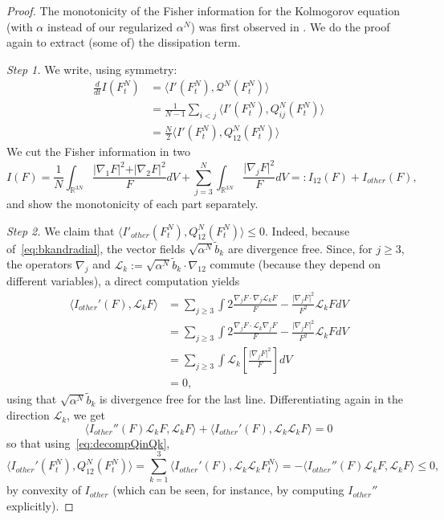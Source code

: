 \documentclass[11pt,a4paper]{article}
\theoremstyle{definition}
\theoremstyle{plain}
\begin{document}
\begin{proof}
    The monotonicity of the Fisher information for the Kolmogorov equation (with $\alpha$ instead of our regularized $\alpha^N$) was first observed in \cite{CarrilloGuo2025}. We do the proof again to extract (some of) the dissipation term.
    
    \textit{Step 1.} We write, using symmetry:
    \begin{align}
    \label{eq:prooffisher}
        \frac{d}{dt} I(F^N_t) &= \langle I'(F^N_t) , \mathcal{Q}^N (F^N_t)\rangle\nonumber\\
        &=\frac{1}{N-1}\sum_{i<j}\langle I'(F^N_t) , Q^N_{ij} (F^N_t)\rangle\nonumber\\
        &=\frac{N}{2}\langle I'(F^N_t) , Q^N_{12} (F^N_t)\rangle
    \end{align}
    We cut the Fisher information in two
    $$I(F)  = \frac{1}{N}\int_{\mathbb{R}^{3N}} \frac{\vert \nabla_1 F \vert^2+\vert \nabla_2 F \vert^2}{F} dV + \sum_{j=3}^N\int_{\mathbb{R}^{3N}} \frac{\vert \nabla_j F \vert^2}{F} dV  =:I_{12}(F)+I_{other}(F),$$
    and show the monotonicity of each part separately.
    
    \textit{Step 2.} We claim that $\langle I'_{other} (F^N_t) , Q^N_{12} (F^N_t)\rangle \leq 0$. Indeed, because of~\eqref{eq:bkandradial}, the vector fields $\sqrt{\alpha^N}\tilde{b}_k$ are divergence free. 
    Since, for $j\geq 3$, the operators $\nabla_j$ and $\mathcal{L}_k:=\sqrt{\alpha^N}\tilde{b}_k \cdot \nabla_{12}$ commute (because they depend on different variables), a direct computation yields
    \begin{align*}
    \langle I_{other}'(F) , \mathcal{L}_k F \rangle &=\sum_{j\geq 3} \int 2 \frac{\nabla_j F \cdot \nabla_j \mathcal{L}_k F}{F} - \frac{\vert \nabla_j F \vert^2}{F^2}\mathcal{L}_k F dV\\
    &=\sum_{j\geq 3} \int 2 \frac{\nabla_j F \cdot \mathcal{L}_k \nabla_j F} {F} - \frac{\vert \nabla_j F \vert^2}{F^2}\mathcal{L}_k F dV\\
    &=\sum_{j\geq 3} \int \mathcal{L}_k \left[\frac{\vert \nabla_j F \vert^2}{F}\right] dV\\
    &=0,
    \end{align*}
    using that $\sqrt{\alpha^N}\tilde{b}_k$ is divergence free for the last line. Differentiating again in the direction $\mathcal{L}_k$,
    we get
    $$\langle I_{other}''(F) \mathcal{L}_k F, \mathcal{L}_k F \rangle + \langle I_{other}'(F) , \mathcal{L}_k \mathcal{L}_k F \rangle=0 $$
    so that using~\eqref{eq:decompQinQk},
    $$\langle I_{other}'(F^N_t) , Q^N_{12} (F^N_t)\rangle = \sum_{k=1}^3\langle I_{other}'(F) , \mathcal{L}_k \mathcal{L}_k F^N_t \rangle = - \langle I_{other}''(F) \mathcal{L}_k F, \mathcal{L}_k F \rangle \leq 0, $$
    by convexity of $I_{other}$ (which can be seen, for instance, by computing $I_{other}''$ explicitly).
    

\end{proof}
\end{document}
